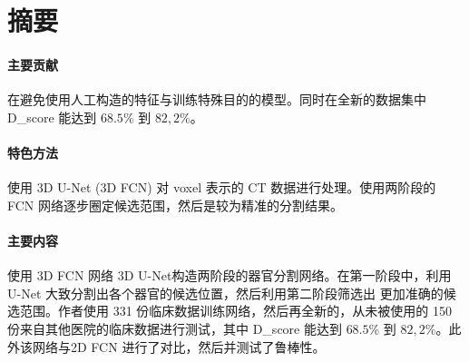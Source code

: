 \section{摘要}
    \paragraph{主要贡献}
        在避免使用人工构造的特征与训练特殊目的的模型。同时在全新的数据集中D_{score} 能达到 $68.5\%$ 到 $82,2\%$。
    \paragraph{特色方法}
        使用 3D U-Net (3D FCN) 对 voxel 表示的 CT 数据进行处理。使用两阶段的 FCN 网络逐步圈定候选范围，然后是较为精准的分割结果。
    \paragraph{主要内容}
        使用 3D FCN 网络 3D U-Net构造两阶段的器官分割网络。在第一阶段中，利用 U-Net 大致分割出各个器官的候选位置，然后利用第二阶段筛选出
        更加准确的候选范围。作者使用 331 份临床数据训练网络，然后再全新的，从未被使用的 150 份来自其他医院的临床数据进行测试，其中
        D_{score} 能达到 $68.5\%$ 到 $82,2\%$。此外该网络与2D FCN 进行了对比，然后并测试了鲁棒性。

        
